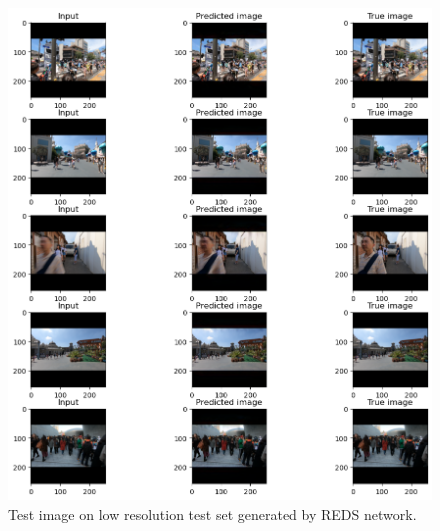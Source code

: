 \begin{figure}[H]
    \centering
    \includegraphics[width=\textwidth,keepaspectratio]{subsections/srndeblur/test.low_res.png}
    \caption{Test image on low resolution test set generated by REDS network.}
\end{figure}
